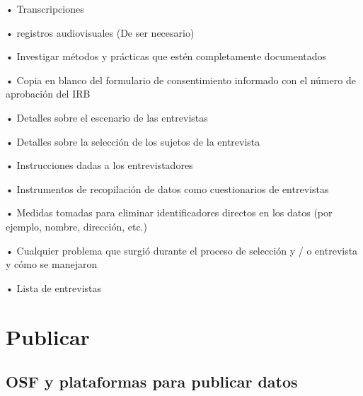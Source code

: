 \documentclass[
  14pt,
]{book}
\begin{document}
• Transcripciones

• registros audiovisuales (De ser necesario)

• Investigar métodos y prácticas que estén completamente documentados

• Copia en blanco del formulario de consentimiento informado con el número de aprobación del IRB

• Detalles sobre el escenario de las entrevistas

• Detalles sobre la selección de los sujetos de la entrevista

• Instrucciones dadas a los entrevistadores

• Instrumentos de recopilación de datos como cuestionarios de entrevistas

• Medidas tomadas para eliminar identificadores directos en los datos (por ejemplo, nombre, dirección, etc.)

• Cualquier problema que surgió durante el proceso de selección y / o entrevista y cómo se manejaron

• Lista de entrevistas

\hypertarget{publicar}{%
\section{\texorpdfstring{\textbf{Publicar}}{Publicar}}\label{publicar}}

\hypertarget{osf-y-plataformas-para-publicar-datos}{%
\subsection{OSF y plataformas para publicar datos}\label{osf-y-plataformas-para-publicar-datos}}
\end{document}
